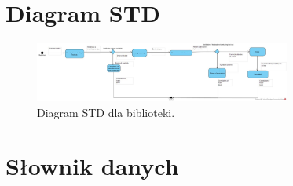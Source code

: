 \documentclass[12pt]{article}
\begin{document}
\newpage
\section{Diagram STD}
\begin{figure}[!h]
    \centering
    \includegraphics[width=0.75\textwidth]{Schemat_STD}
    \caption{Diagram STD dla biblioteki.}
\end{figure}

\section{Słownik danych}
\end{document}
